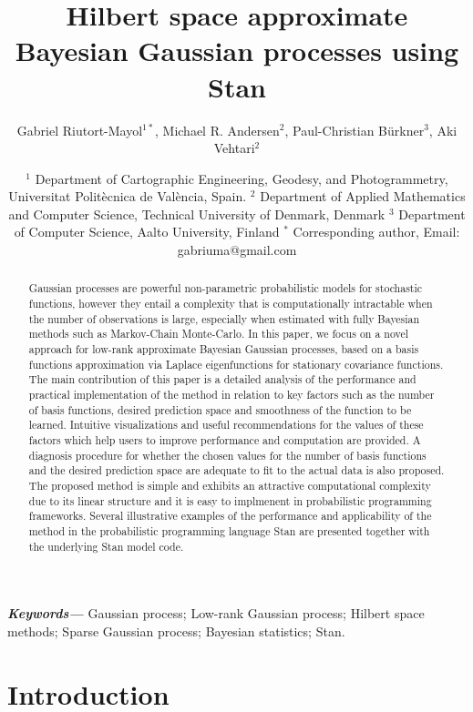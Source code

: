\documentclass[onecolumn,a4paper,11pt]{article}
\title{Hilbert space approximate Bayesian Gaussian processes using Stan}
\author{Gabriel Riutort-Mayol$^{1*}$, Michael R. Andersen$^2$, Paul-Christian Bürkner$^{3}$, Aki Vehtari$^{2}$}
\date{ \small
$^1$ Department of Cartographic Engineering, Geodesy, and Photogrammetry, Universitat Polit\`ecnica de Val\`encia, Spain. \break
$^2$ Department of Applied Mathematics and Computer Science, Technical University of Denmark, Denmark
$^3$ Department of Computer Science, Aalto University, Finland\break
$^*$ Corresponding author, Email: gabriuma@gmail.com
}
\providecommand{\keywords}[1]
{
  \small	
  \textbf{\textit{Keywords---}} #1
}
\begin{document}
\maketitle

\begin{abstract}
Gaussian processes are powerful non-parametric probabilistic models for stochastic functions, however they entail a complexity that is computationally intractable when the number of observations is large, especially when estimated with fully Bayesian methods such as Markov-Chain Monte-Carlo. In this paper, we focus on a novel approach for low-rank approximate Bayesian Gaussian processes, based on a basis functions approximation via Laplace eigenfunctions for stationary covariance functions. The main contribution of this paper is a detailed analysis of the performance and practical implementation of the method in relation to key factors such as the number of basis functions, desired prediction space and smoothness of the function to be learned. Intuitive visualizations and useful recommendations for the values of these factors which help users to improve performance and computation are provided. A diagnosis procedure for whether the chosen values for the number of basis functions and the desired prediction space are adequate to fit to the actual data is also proposed. The proposed method is simple and exhibits an attractive computational complexity due to its linear structure and it is easy to implmenent in probabilistic programming frameworks. Several illustrative examples of the performance and applicability of the method in the probabilistic programming language Stan are presented together with the underlying Stan model code.
\end{abstract}

\keywords{Gaussian process; Low-rank Gaussian process; Hilbert space methods; Sparse Gaussian process; Bayesian statistics; Stan.}


\section{Introduction}\label{sec_bf_intro}
\end{document}
